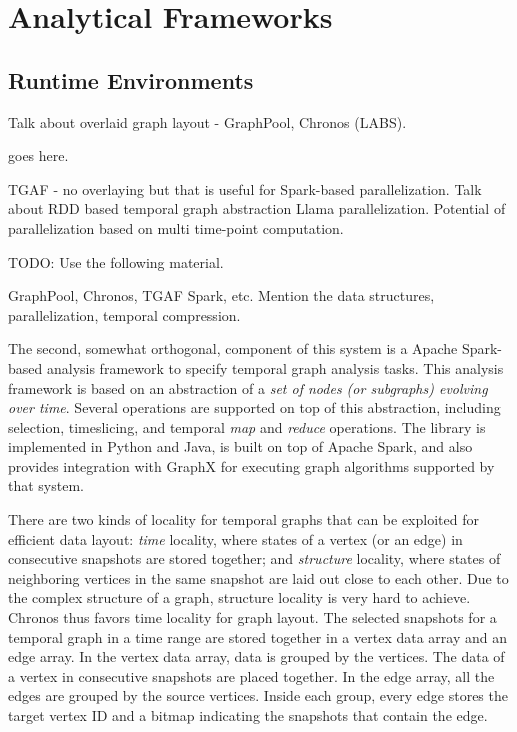 \documentclass{svjour3}
\begin{document}
\section{Analytical Frameworks}

\subsection{Runtime Environments}

 Talk about overlaid graph layout - GraphPool, Chronos (LABS).  

 goes here.

 TGAF - no overlaying but that is useful for Spark-based parallelization. Talk about RDD based temporal graph abstraction
Llama parallelization. Potential of parallelization based on multi time-point computation.


TODO: Use the following material.

GraphPool, Chronos, TGAF Spark, etc. Mention the data structures, parallelization, temporal compression.

\vspace{2mm}
 The second, somewhat orthogonal, component of this system is a Apache Spark-based analysis
framework to specify temporal graph analysis tasks. This analysis framework is based on an abstraction of a \textit{set of nodes 
(or subgraphs) evolving over time}. Several operations are supported on top of this abstraction, including selection, timeslicing, and
temporal {\em map} and {\em reduce} operations. The library is implemented in Python and Java, is built on top of Apache Spark, and also provides
integration with GraphX for executing graph algorithms supported by that system.



 There are two kinds of locality for temporal graphs that can be exploited for efficient data layout: \emph{time} locality, where states of a vertex (or an edge) in consecutive snapshots are stored together; and \emph{structure} locality, where states of neighboring vertices in the same snapshot are laid out close to each other. Due to the complex structure of a graph, structure locality is very hard to achieve. Chronos thus favors time locality for graph layout. The selected snapshots for a temporal graph in a time range are stored together in a vertex data array and an edge array. In the vertex data array, data is grouped by the vertices. The data of a vertex in consecutive snapshots are placed together. In the edge array, all the edges are grouped by the source vertices. Inside each group, every edge stores the target vertex ID and a bitmap indicating the snapshots that contain the edge. 
\end{document}
